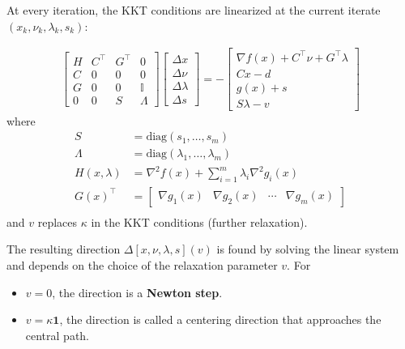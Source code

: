 \newpar{}
At every iteration, the KKT conditions are linearized at the current iterate $(x_k, \nu_k, \lambda_k, s_k)$:

\begin{align*}
    \begin{bmatrix}
        H & C^\top & {G}^\top & 0          \\
        C & 0      & 0        & 0          \\
        G & 0      & 0        & \mathbb{I} \\
        0 & 0      & S        & \Lambda
    \end{bmatrix}
    \begin{bmatrix}
        \Delta x      \\
        \Delta\nu     \\
        \Delta\lambda \\
        \Delta s
    \end{bmatrix}=-
    \begin{bmatrix}
        \nabla f(x)+C^\top\nu+{G}^\top\lambda \\
        Cx-d                                  \\
        g(x)+s                                \\
        S\lambda-v
    \end{bmatrix}
\end{align*}
where
\begin{align*}
    S            & = \mathrm{diag}(s_1, \ldots, s_m)                          \\
    \Lambda      & = \mathrm{diag}(\lambda_1, \ldots, \lambda_m)              \\
    H(x,\lambda) & = \nabla^2 f(x) + \sum_{i=1}^{m} \lambda_i \nabla^2 g_i(x) \\
    {G(x)}^\top  & = \begin{bmatrix}
                         \nabla g_1(x) & \nabla g_2(x) & \cdots & \nabla g_m(x)
                     \end{bmatrix}   \\
\end{align*}
and $v$ replaces $\kappa$ in the KKT conditions (further relaxation).

\newpar{}
The resulting direction $\Delta [x,\nu,\lambda,s](v)$ is found by solving the linear system and depends on the choice of the relaxation parameter $v$.
For
\begin{itemize}
    \item $v=0$, the direction is a \textbf{Newton step}.
    \item $v=\kappa \mathbf{1}$, the direction is called a centering direction that approaches the central path.
\end{itemize}

